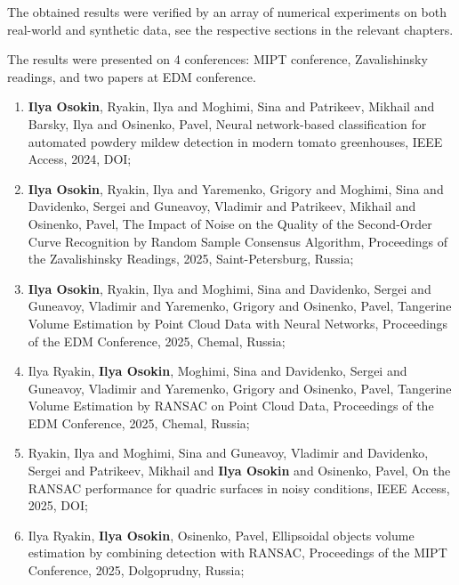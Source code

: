 
The obtained results were verified by an array of numerical experiments on both real-world and synthetic data, see the respective sections in the relevant chapters.


The results were presented on 4 conferences: MIPT conference, Zavalishinsky readings, and two papers at EDM conference.

\begin{enumerate}[leftmargin=18pt]
	\item \textbf{Ilya Osokin},  Ryakin, Ilya and Moghimi, Sina and Patrikeev, Mikhail and Barsky, Ilya and Osinenko, Pavel, Neural network-based classification for automated powdery mildew detection in modern tomato greenhouses, IEEE Access, 2024, DOI;
	\item \textbf{Ilya Osokin}, Ryakin, Ilya and Yaremenko, Grigory and Moghimi, Sina and Davidenko, Sergei and Guneavoy, Vladimir and Patrikeev, Mikhail and Osinenko, Pavel, The Impact of Noise on the Quality of the Second-Order Curve Recognition by Random Sample Consensus Algorithm, Proceedings of the Zavalishinsky Readings, 2025, Saint-Petersburg, Russia;
	\item \textbf{Ilya Osokin}, Ryakin, Ilya and Moghimi, Sina and Davidenko, Sergei and Guneavoy, Vladimir and Yaremenko, Grigory and Osinenko, Pavel, Tangerine Volume Estimation by Point Cloud Data with Neural Networks, Proceedings of the EDM Conference, 2025, Chemal, Russia;
	\item Ilya Ryakin, \textbf{Ilya Osokin}, Moghimi, Sina and Davidenko, Sergei and Guneavoy, Vladimir and Yaremenko, Grigory and Osinenko, Pavel, Tangerine Volume Estimation by RANSAC on Point Cloud Data, Proceedings of the EDM Conference, 2025, Chemal, Russia;
	\item Ryakin, Ilya and Moghimi, Sina and Guneavoy, Vladimir and Davidenko, Sergei and Patrikeev, Mikhail and \textbf{Ilya Osokin} and Osinenko, Pavel, On the RANSAC performance for quadric surfaces in noisy conditions, IEEE Access, 2025, DOI;
	\item Ilya Ryakin, \textbf{Ilya Osokin}, Osinenko, Pavel, Ellipsoidal objects volume estimation by combining detection with RANSAC, Proceedings of the MIPT Conference, 2025, Dolgoprudny, Russia;
\end{enumerate}

